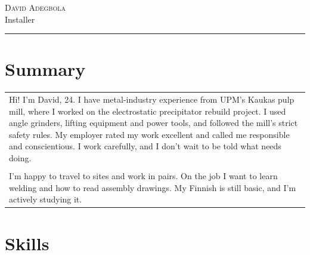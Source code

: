 \documentclass[a4paper,11pt]{article}
\begin{document}
\setlength{\cvlabelw}{3.9cm}

\begin{cvheader}
\par{\centering
		{\Huge \textsc{David Adegbola}}\\[0.4em]
		{\Large Installer}
	\bigskip\par}

\hrule
\vspace{0.5em}
\end{cvheader}

\section{Summary}
\begin{tabular}{p{}}
 Hi! I'm David, 24. I have metal-industry experience from UPM's Kaukas pulp mill, where I worked on the electrostatic precipitator rebuild project. I used angle grinders, lifting equipment and power tools, and followed the mill's strict safety rules. My employer rated my work excellent and called me responsible and conscientious. I work carefully, and I don't wait to be told what needs doing.\\\\

 I'm happy to travel to sites and work in pairs. On the job I want to learn welding and how to read assembly drawings. My Finnish is still basic, and I'm actively studying it.
\end{tabular}

\section{Skills}
\end{document}
